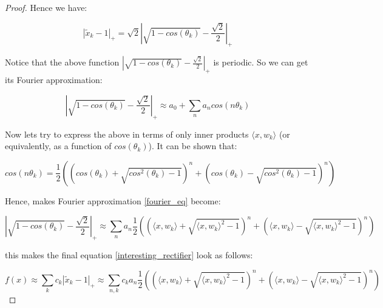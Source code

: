 \documentclass[12pt]{article}
\begin{document}
\begin{proof}
Hence we have:

$$| \tilde{x}_k - 1 |_+ =  \sqrt{2} | \sqrt{ 1 - cos(\theta_k)} - \frac{ \sqrt{2} }{2}   |_+$$

Notice that the above function $| \sqrt{ 1 - cos(\theta_k)} - \frac{ \sqrt{2} }{2}   |_+ $ is periodic. So we can get its Fourier approximation:

\begin{equation}
\label{fourier_eq}
| \sqrt{ 1 - cos(\theta_k)} - \frac{ \sqrt{2} }{2}   |_+ \approx a_0 +  \sum_n a_n cos(n \theta_k)
\end{equation}

Now lets try to express the above in terms of only inner products $\langle x, w_k \rangle$ (or equivalently, as a function of $cos(\theta_k)$). It can be shown that:

$$ cos(n \theta_k)  = \frac{1}{2} \left( \left( cos(\theta_k) + \sqrt{cos^2(\theta_k) -1} \right)^n + \left( cos(\theta_k) - \sqrt{cos^2(\theta_k) - 1} \right)^n  \right) $$

Hence, makes Fourier approximation \eqref{fourier_eq} become:

$$ | \sqrt{ 1 - cos(\theta_k)} - \frac{ \sqrt{2} }{2}   |_+ \approx \sum_n a_n \frac{1}{2} \left( \left( \langle x, w_k \rangle + \sqrt{\langle x, w_k \rangle^2 -1} \right)^n + \left( \langle x, w_k \rangle - \sqrt{\langle x, w_k \rangle^2 - 1} \right)^n  \right) $$

this makes the final equation \eqref{interesting_rectifier} look as follows:

$$ f(x) \approx \sum_k c_k | \tilde{x}_k - 1 |_+ \approx  \sum_{n,k} c_k a_n \frac{1}{2} \left( \left( \langle x, w_k \rangle + \sqrt{\langle x, w_k \rangle^2 -1} \right)^n + \left( \langle x, w_k \rangle - \sqrt{\langle x, w_k \rangle^2 - 1} \right)^n  \right)$$


\end{proof}
\end{document}
